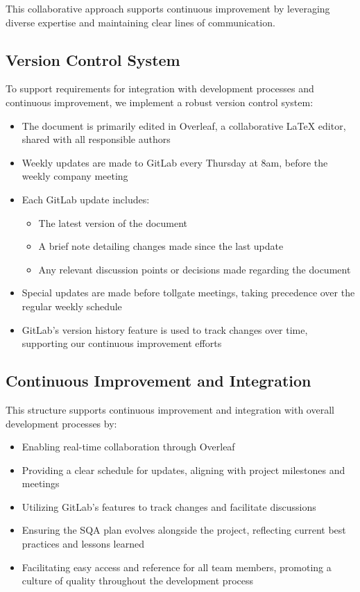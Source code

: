 \documentclass{article}
\begin{document}
This collaborative approach supports continuous improvement by leveraging diverse expertise and maintaining clear lines of communication.

\subsection{Version Control System}
To support requirements for integration with development processes and continuous improvement, we implement a robust version control system:

\begin{itemize}
    \item The document is primarily edited in Overleaf, a collaborative LaTeX editor, shared with all responsible authors
    \item Weekly updates are made to GitLab every Thursday at 8am, before the weekly company meeting
    \item Each GitLab update includes:
    \begin{itemize}
        \item The latest version of the document
        \item A brief note detailing changes made since the last update
        \item Any relevant discussion points or decisions made regarding the document
    \end{itemize}
    \item Special updates are made before tollgate meetings, taking precedence over the regular weekly schedule
    \item GitLab's version history feature is used to track changes over time, supporting our continuous improvement efforts
\end{itemize}

\subsection{Continuous Improvement and Integration}
This structure supports continuous improvement and integration with overall development processes by:

\begin{itemize}
    \item Enabling real-time collaboration through Overleaf
    \item Providing a clear schedule for updates, aligning with project milestones and meetings
    \item Utilizing GitLab's features to track changes and facilitate discussions
    \item Ensuring the SQA plan evolves alongside the project, reflecting current best practices and lessons learned
    \item Facilitating easy access and reference for all team members, promoting a culture of quality throughout the development process
\end{itemize}
\end{document}
